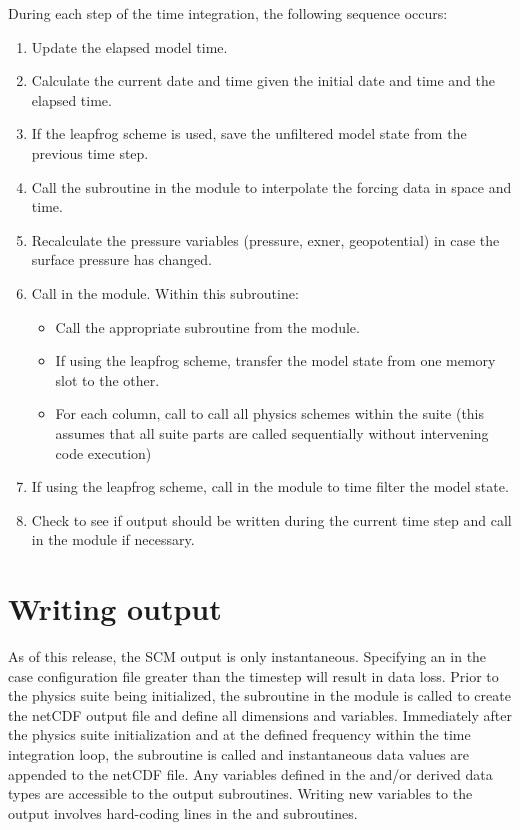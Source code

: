 During each step of the time integration, the following sequence occurs:
\begin{enumerate}
\item Update the elapsed model time.
\item Calculate the current date and time given the initial date and time and the elapsed time.
\item If the leapfrog scheme is used, save the unfiltered model state from the previous time step.
\item Call the  subroutine in the  module to interpolate the forcing data in space and time.
\item Recalculate the pressure variables (pressure, exner, geopotential) in case the surface pressure has changed.
\item Call  in the  module. Within this subroutine:
\begin{itemize}
\item Call the appropriate  subroutine from the  module.
\item If using the leapfrog scheme, transfer the model state from one memory slot to the other.
\item For each column, call  to call all physics schemes within the suite (this assumes that all suite parts are called sequentially without intervening code execution)
\end{itemize}
\item If using the leapfrog scheme, call  in the  module to time filter the model state.
\item Check to see if output should be written during the current time step and call  in the  module if necessary.
\end{enumerate}

\section{Writing output}

As of this release, the SCM output is only instantaneous. Specifying an  in the case configuration file greater than the timestep will result in data loss. Prior to the physics suite being initialized, the  subroutine in the  module is called to create the netCDF output file and define all dimensions and variables. Immediately after the physics suite initialization and at the defined frequency within the time integration loop, the  subroutine is called and instantaneous data values are appended to the netCDF file. Any variables defined in the  and/or  derived data types are accessible to the output subroutines. Writing new variables to the output involves hard-coding lines in the  and  subroutines. 
